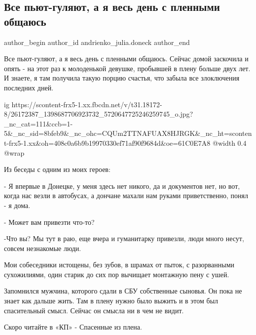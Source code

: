  
 
 
 
 
 
\subsection{Все пьют-гуляют, а я весь день с пленными общаюсь}
\label{sec:29_12_2017.fb.andrienko_julia.doneck.1.plennyje}
 
\ifcmt
 author_begin
   author_id andrienko_julia.doneck
 author_end
\fi

Все пьют-гуляют, а я весь день с пленными общаюсь. Сейчас домой заскочила и
опять - на этот раз к молоденькой девушке, пробывшей в плену больше двух лет. И
знаете, я там получила такую порцию счастья, что забыла все злоключения
последних дней.

\ifcmt
  ig https://scontent-frx5-1.xx.fbcdn.net/v/t31.18172-8/26172387_1398687706923732_5720647725246259745_o.jpg?_nc_cat=111&ccb=1-5&_nc_sid=8bfeb9&_nc_ohc=CQUm2TTNAFUAX8HJRGK&_nc_ht=scontent-frx5-1.xx&oh=408c0a6b9b19970330ef71af90f9684d&oe=61C0E7A8
  @width 0.4
  @wrap 
\fi

Из беседы с одним из моих героев:

- Я впервые в Донецке, у меня здесь нет никого, да и документов нет, но вот,
когда нас везли в автобусах, а дончане махали нам руками приветственно, понял -
я дома.

- Может вам привезти что-то?

-Что вы? Мы тут в раю, еще вчера и гуманитарку привезли, люди много несут,
совсем незнакомые люди.

Мои собеседники истощены, без зубов, в шрамах от пыток, с разорванными
сухожилиями, один старик до сих пор вычищает монтажную пену с ушей.

Запомнился мужчина, которого сдали в СБУ собственные сыновья. Он пока не знает
как дальше жить. Там в плену нужно было выжить и в этом был спасительный смысл.
Сейчас он смысла ни в чем не видит.

Скоро читайте в «КП» - Спасенные из плена.

